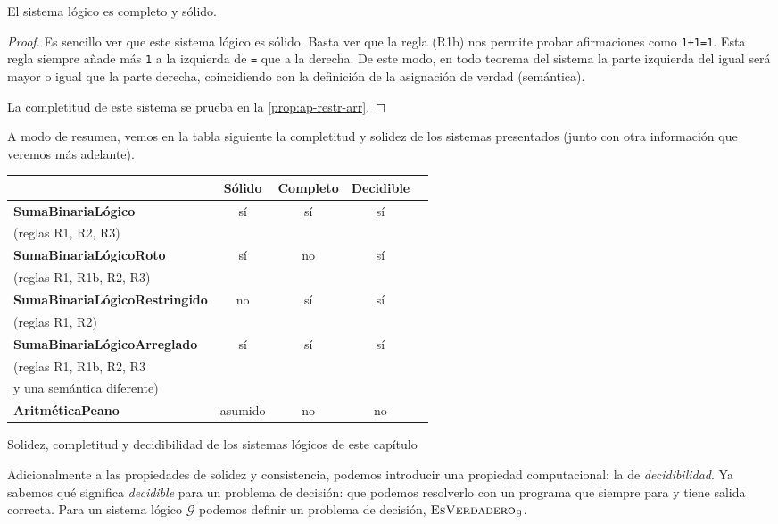 \begin{proposicion}
El sistema lógico  es completo y sólido.
\end{proposicion}
\begin{proof}
Es sencillo ver que este sistema lógico es sólido. Basta ver que la regla (R1b) nos permite probar afirmaciones como \texttt{1+1=1}. Esta regla siempre añade más \texttt{1} a la izquierda de \texttt{=} que a la derecha. De este modo, en todo teorema del sistema la parte izquierda del igual será mayor o igual que la parte derecha, coincidiendo con la definición de la asignación de verdad (semántica).

La completitud de este sistema se prueba en la \cref{prop:ap-restr-arr}.
\end{proof}
A modo de resumen, vemos en la tabla siguiente la completitud y solidez de los sistemas presentados (junto con otra información que veremos más adelante).
\begin{tabla}
\begin{table}[H]
\centering
\begin{tabular}{@{}lcccc@{}}
\cmidrule[0.7pt]{2-4}
 & Sólido & Completo & Decidible \\ \midrule
\textbf{SumaBinariaLógico} & sí & sí & sí \\
(reglas R1, R2, R3)\\[4pt]
\textbf{SumaBinariaLógicoRoto} & sí & no & sí \\
(reglas R1, R1b, R2, R3)\\[4pt]
\textbf{SumaBinariaLógicoRestringido} & no & sí & sí \\
(reglas R1, R2)\\[4pt]
\textbf{SumaBinariaLógicoArreglado} & sí & sí & sí \\
(reglas R1, R1b, R2, R3\\
y una semántica diferente)\\[4pt]
\textbf{AritméticaPeano} & asumido & no & no
\\ \bottomrule
\end{tabular}
\end{table}
\vspace{-8pt}
\caption{Solidez, completitud y decidibilidad de los sistemas lógicos de este capítulo}
\label{tab:sistemas-logicos}
\end{tabla}
Adicionalmente a las propiedades de solidez y consistencia, podemos introducir una propiedad computacional: la de \emph{decidibilidad}. Ya sabemos qué significa \emph{decidible} para un problema de decisión: que podemos resolverlo con un programa que siempre para y tiene salida correcta. Para un sistema lógico $\mathcal{G}$ podemos definir un problema de decisión, $\textsc{EsVerdadero}_\mathcal{G}$.
